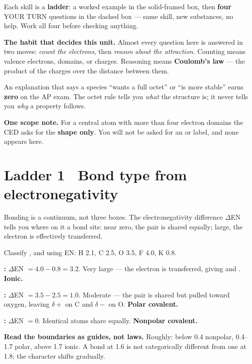 \documentclass{apchem-worksheet}
\begin{document}
\apctitleblock

\begin{apcnote}
Each skill is a \textbf{ladder}: a worked example in the solid-framed box,
then \textbf{four} YOUR TURN questions in the dashed box --- same skill,
new substances, no help. Work all four before checking anything.

\textbf{The habit that decides this unit.} Almost every question here is
answered in two moves: \emph{count the electrons}, then \emph{reason about
the attraction}. Counting means valence electrons, domains, or charges.
Reasoning means \textbf{Coulomb's law} --- the product of the charges over
the distance between them.

An explanation that says a species ``wants a full octet'' or ``is more
stable'' earns \textbf{zero} on the AP exam. The octet rule tells you
\emph{what} the structure is; it never tells you \emph{why} a property
follows.

\textbf{One scope note.} For a central atom with more than four electron
domains the CED asks for the \textbf{shape only}. You will not be asked
for an  or  label, and none appears here.
\end{apcnote}

\section*{\sffamily Ladder 1 \textbullet\ Bond type from electronegativity}

Bonding is a continuum, not three boxes. The electronegativity difference
$\Delta$EN tells you where on it a bond sits: near zero, the pair is
shared equally; large, the electron is effectively transferred.

\begin{workedexample}
Classify ,  and  using
EN: H 2.1, C 2.5, O 3.5, F 4.0, K 0.8.

\textbf{:} $\Delta$EN $= 4.0 - 0.8 = 3.2$. Very large --- the
electron is transferred, giving  and . \textbf{Ionic.}

\textbf{:} $\Delta$EN $= 3.5 - 2.5 = 1.0$. Moderate --- the pair
is shared but pulled toward oxygen, leaving $\delta+$ on C and $\delta-$
on O. \textbf{Polar covalent.}

\textbf{:} $\Delta$EN $= 0$. Identical atoms share equally.
\textbf{Nonpolar covalent.}

\textbf{Read the boundaries as guides, not laws.} Roughly: below
\num{0.4} nonpolar, \num{0.4}--\num{1.7} polar, above \num{1.7} ionic. A
bond at \num{1.6} is not categorically different from one at \num{1.8};
the character shifts gradually.
\end{workedexample}
\end{document}
